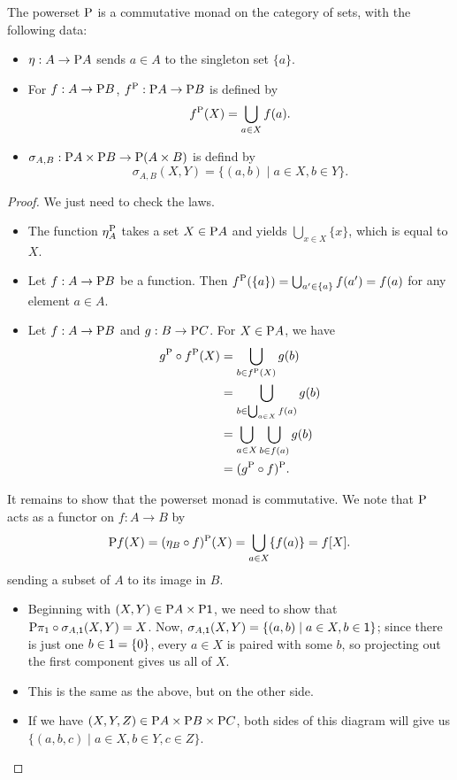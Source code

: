 \documentclass[DynamicalBook]{subfiles}
\begin{document}
\begin{proposition}\label{prop.powerset_commutative_monad}
  The powerset $\mathrm{P}$ is a commutative monad on the category of sets, with
  the following data:
  \begin{itemize}
   \item $\eta : A \to \mathrm{P} A$ sends $a \in A$ to the singleton set $\{a\}$.
   \item For $f : A \to \mathrm{P} B$, $f^{\mathrm{P}} : \mathrm{P} A \to \mathrm{P} B$ is
     defined by
     $$f^{\mathrm{P}}(X) = \bigcup_{a \in X} f(a).$$
   \item $\sigma_{A, B} : \mathrm{P} A \times \mathrm{P} B \to \mathrm{P} (A \times B)$
     is defind by
     $$\sigma_{A, B}(X, Y) = \{(a, b) \mid a \in X, b \in Y\}.$$
  \end{itemize}
\end{proposition}
\begin{proof}
  We just need to check the laws.
  \begin{itemize}
    \item The function $\eta_A^{\mathrm{P}}$ takes a set $X \in \mathrm{P} A$ and
      yields $\bigcup_{x \in X} \{x\}$, which is equal to $X$.
    \item Let $f : A \to \mathrm{P} B$ be a function. Then $f^{\mathrm{P}}(\{a\}) =
      \bigcup_{a' \in \{a\}}f(a') = f(a)$ for any element $a \in A$.
    \item Let $f : A \to \mathrm{P} B$ and $g : B \to \mathrm{P} C$. For $X \in
      \mathrm{P} A$, we have
\begin{align*}
  g^{\mathrm{P}} \circ f^{\mathrm{P}}(X) &= \bigcup_{b \in f^{\mathrm{P}}(X)} g(b) \\
&= \bigcup_{b \in \bigcup_{a \in X} f(a)} g(b) \\
&= \bigcup_{a \in X} \bigcup_{b \in f(a)} g(b) \\
&= (g^{\mathrm{P}} \circ f)^{\mathrm{P}}.
\end{align*}
  \end{itemize}
  
It remains to show that the powerset monad is commutative. We note that
$\mathrm{P}$ acts as a functor on $f : A \to B$ by 
\[
\mathrm{P} f (X) = (\eta_B \circ
f)^{\mathrm{P}}(X) = \bigcup_{a \in X}\{f(a)\} = f[X].
\]
sending a subset of $A$ to its image in $B$.
\begin{itemize}
  \item Beginning with $(X, Y) \in \mathrm{P} A \times \mathrm{P} \mathsf{1}$, we need to
    show that $\mathrm{P} \pi_1 \circ \sigma_{A, \mathsf{1}}(X, Y) = X$. Now,
    $\sigma_{A, \mathsf{1}}(X, Y) = \{(a, b) \mid a \in X, b \in \mathsf{1}\}$; since
    there is just one $b \in \mathsf{1} = \{0\}$, every $a \in X$ is paired with
    some $b$, so projecting out the first component gives us all of $X$.
    \item This is the same as the above, but on the other side.
    \item If we have $(X, Y, Z) \in \mathrm{P} A \times \mathrm{P} B \times \mathrm{P}
      C$, both sides of this diagram will give us $\{(a, b, c) \mid a \in X, b
      \in Y, c \in Z\}$. 
\end{itemize}
\end{proof}
\end{document}

